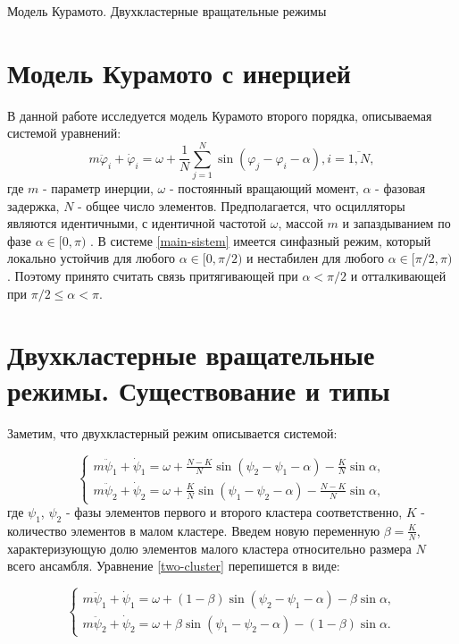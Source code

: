 \begin{chapter}{Модель Курамото. Двухкластерные вращательные режимы}
	\section{Модель Курамото с инерцией}
	В данной работе исследуется модель Курамото второго порядка, описываемая системой уравнений:
	\begin{equation} \label{main-sistem}
		m\ddot{\varphi}_i + \dot{\varphi}_i = \omega + 
		\frac{1}{N} \sum_{j = 1}^N \sin{(\varphi_j - 
		\varphi_i - \alpha)}, i = \overline{1, N}, 
	\end{equation}
	где $m$ - параметр инерции, $\omega$ - постоянный вращающий момент,
	$\alpha$ - фазовая задержка, $N$ - общее число элементов.
	Предполагается, что осцилляторы являются идентичными, с идентичной частотой $\omega$, массой $m$ и запаздыванием по
	фазе $\alpha \in [0, \pi)$ \cite{Sakaguchi} . В системе \eqref{main-sistem} имеется синфазный режим,
	который локально устойчив для любого $\alpha \in [0, \pi/2)$
	и нестабилен для любого $\alpha \in [\pi/2, \pi)$ \cite{Acebron:Bonilla}. Поэтому принято считать связь притягивающей при
	$\alpha < \pi/2$ и отталкивающей при $\pi/2 \leq \alpha < \pi$.

	\section{Двухкластерные вращательные режимы. Существование и типы}
	
	Заметим, что двухкластерный режим описывается системой:
	
	\begin{equation} \label{two-cluster}
		\begin{cases}
			m\ddot{\psi}_1 + \dot{\psi}_1 = \omega + \frac{N-K}{N} \sin{(\psi_2 - \psi_1 - \alpha)} - \frac{K}{N}\sin{\alpha},\\
			m\ddot{\psi}_2 + \dot{\psi}_2 = \omega + \frac{K}{N} \sin{(\psi_1 - \psi_2 - \alpha)} - \frac{N - K}{N}\sin{\alpha},
		\end{cases}
	\end{equation}
	где $\psi_1$, $\psi_2$ - фазы элементов первого и
	второго кластера соответственно, $K$ - количество элементов в малом кластере.
	Введем новую переменную $\beta = \frac{K}{N}$, характеризующую долю элементов малого кластера относительно размера $N$ всего ансамбля.
	Уравнение \eqref{two-cluster} перепишется в виде:
	
	\begin{equation} \label{two-cluster-beta}
		\begin{cases}
			m\ddot{\psi}_1 + \dot{\psi}_1 = \omega + (1 - \beta) \sin{(\psi_2 - \psi_1 - \alpha)} - \beta\sin{\alpha}, \\
			m\ddot{\psi}_2 + \dot{\psi}_2 = \omega + \beta \sin{(\psi_1 - \psi_2 - \alpha)} - (1 - \beta)\sin{\alpha}.
		\end{cases}
	\end{equation}
	

\end{chapter}
